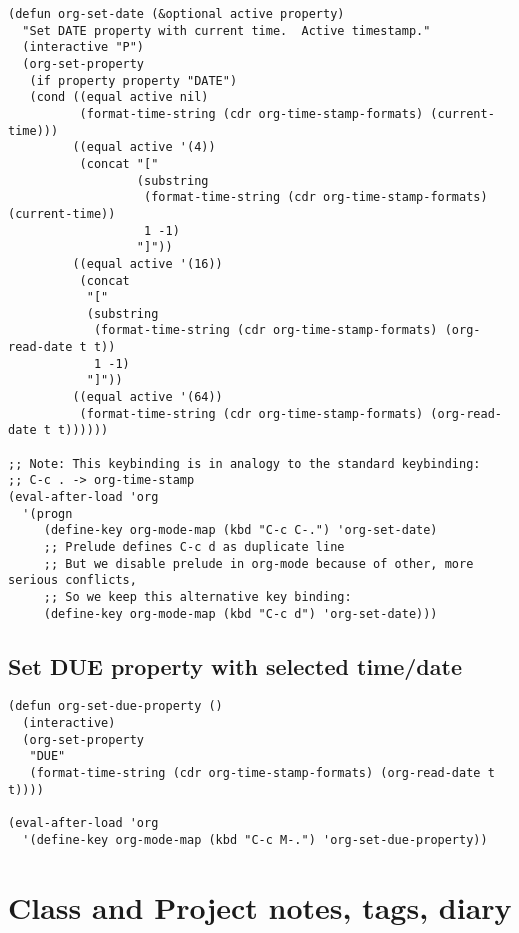 \documentclass[10pt]{article}
\begin{document}
\begin{verbatim}
(defun org-set-date (&optional active property)
  "Set DATE property with current time.  Active timestamp."
  (interactive "P")
  (org-set-property
   (if property property "DATE")
   (cond ((equal active nil)
          (format-time-string (cdr org-time-stamp-formats) (current-time)))
         ((equal active '(4))
          (concat "["
                  (substring
                   (format-time-string (cdr org-time-stamp-formats) (current-time))
                   1 -1)
                  "]"))
         ((equal active '(16))
          (concat
           "["
           (substring
            (format-time-string (cdr org-time-stamp-formats) (org-read-date t t))
            1 -1)
           "]"))
         ((equal active '(64))
          (format-time-string (cdr org-time-stamp-formats) (org-read-date t t))))))

;; Note: This keybinding is in analogy to the standard keybinding:
;; C-c . -> org-time-stamp
(eval-after-load 'org
  '(progn
     (define-key org-mode-map (kbd "C-c C-.") 'org-set-date)
     ;; Prelude defines C-c d as duplicate line
     ;; But we disable prelude in org-mode because of other, more serious conflicts,
     ;; So we keep this alternative key binding:
     (define-key org-mode-map (kbd "C-c d") 'org-set-date)))
\end{verbatim}

\subsection{Set DUE property with selected time/date}
\label{sec-8-6}

\begin{verbatim}
(defun org-set-due-property ()
  (interactive)
  (org-set-property
   "DUE"
   (format-time-string (cdr org-time-stamp-formats) (org-read-date t t))))

(eval-after-load 'org
  '(define-key org-mode-map (kbd "C-c M-.") 'org-set-due-property))
\end{verbatim}

\section{Class and Project notes, tags, diary}
\label{sec-9}
\end{document}
